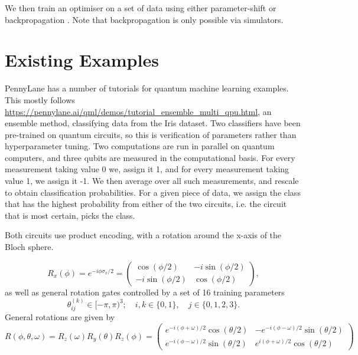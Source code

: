 \documentclass{article}
\theoremstyle{definition}
\begin{document}
We then train an optimiser on a set of data using either parameter-shift \cite{crooks2019gradients} or backpropagation \cite{watabe2019quantum}. Note that backpropagation is only possible via simulators.


\section{Existing Examples}
PennyLane has a number of tutorials for quantum machine learning examples. This mostly follows \\ \url{https://pennylane.ai/qml/demos/tutorial_ensemble_multi_qpu.html}, an ensemble method, classifying data from the Iris dataset. Two classifiers have been pre-trained on quantum circuits, so this is verification of parameters rather than hyperparameter tuning. Two computations are run in parallel on quantum computers, and three qubits are measured in the computational basis. For every measurement taking value 0 we, assign it 1, and for every measurement taking value 1, we assign it -1. We then average over all such measurements,  and rescale to obtain classification probabilities. For a given piece of data, we assign the class that has the highest probability from either of the two circuits, i.e. the circuit that is most certain, picks the class. 

Both circuits use product encoding, with a rotation around the x-axis of the Bloch sphere.

\[
R_x(\phi) = e^{ - i \phi \sigma_x / 2} = \begin{pmatrix} \cos ( \phi / 2) & - i \sin (\phi / 2) \\ - i \sin( \phi / 2) & \cos(\phi / 2)
\end{pmatrix},
\]
as well as general rotation gates controlled by a set of 16 training parameters 
\[
\theta_{ij}^{(k)} \in [- \pi, \pi)^3 ; \quad  i,k \in \{0,1\}, \quad j \in \{0,1,2,3\}.
\]
General rotations are given by
\[
R(\phi, \theta, \omega) = R_z(\omega)R_y(\theta)R_z(\phi) = \begin{pmatrix} e^{-i ( \phi + \omega) /2}\cos ( \theta / 2) & - e^{-i ( \phi - \omega) /2} \sin (\theta / 2) \\ e^{-i ( \phi - \omega) /2} \sin( \theta / 2) &  e^{i ( \phi + \omega) /2}\cos(\theta / 2)
\end{pmatrix}
\]
\end{document}
